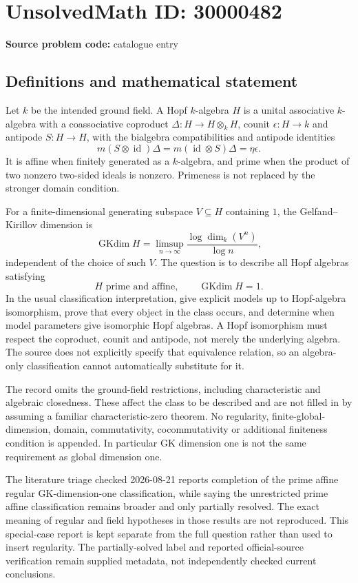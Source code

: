 \documentclass[11pt]{article}
\begin{document}
\section*{UnsolvedMath ID: 30000482}
\textbf{Source problem code:} catalogue entry
\subsection{Definitions and mathematical statement}
Let \(k\) be the intended ground field. A Hopf \(k\)-algebra \(H\) is a unital associative \(k\)-algebra with a coassociative coproduct \(\Delta:H\to H\otimes_k H\), counit \(\epsilon:H\to k\) and antipode \(S:H\to H\), with the bialgebra compatibilities and antipode identities
\[
 m(S\otimes\operatorname{id})\Delta
 =m(\operatorname{id}\otimes S)\Delta=\eta\epsilon.
\]
It is affine when finitely generated as a \(k\)-algebra, and prime when the product of two nonzero two-sided ideals is nonzero. Primeness is not replaced by the stronger domain condition.

For a finite-dimensional generating subspace \(V\subseteq H\) containing \(1\), the Gelfand--Kirillov dimension is
\[
 \operatorname{GKdim}H=
 \limsup_{n\to\infty}\frac{\log\dim_k(V^n)}{\log n},
\]
independent of the choice of such \(V\). The question is to describe all Hopf algebras satisfying
\[
 H\text{ prime and affine},\qquad\operatorname{GKdim}H=1.
\]
In the usual classification interpretation, give explicit models up to Hopf-algebra isomorphism, prove that every object in the class occurs, and determine when model parameters give isomorphic Hopf algebras. A Hopf isomorphism must respect the coproduct, counit and antipode, not merely the underlying algebra. The source does not explicitly specify that equivalence relation, so an algebra-only classification cannot automatically substitute for it.

The record omits the ground-field restrictions, including characteristic and algebraic closedness. These affect the class to be described and are not filled in by assuming a familiar characteristic-zero theorem. No regularity, finite-global-dimension, domain, commutativity, cocommutativity or additional finiteness condition is appended. In particular GK dimension one is not the same requirement as global dimension one.

The literature triage checked 2026-08-21 reports completion of the prime affine regular GK-dimension-one classification, while saying the unrestricted prime affine classification remains broader and only partially resolved. The exact meaning of regular and field hypotheses in those results are not reproduced. This special-case report is kept separate from the full question rather than used to insert regularity. The partially-solved label and reported official-source verification remain supplied metadata, not independently checked current conclusions.
\end{document}
